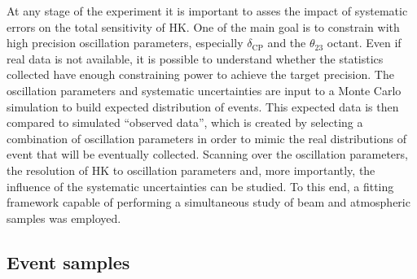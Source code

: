 At any stage of the experiment it is important to asses the impact of systematic errors on the total sensitivity of HK.
One of the main goal is to constrain with high precision oscillation parameters, especially $\delta_\text{CP}$ %
and the $\theta_{23}$ octant.
Even if real data is not available, it is possible to understand whether the statistics collected have %
enough constraining power to achieve the target precision.
The oscillation parameters and systematic uncertainties are input to a Monte Carlo simulation %
to build expected distribution of events.
This expected data is then compared to simulated ``observed data'', which is created by selecting %
a combination of oscillation parameters in order to mimic the real distributions of event that will be eventually collected.
Scanning over the oscillation parameters, the resolution of HK to oscillation parameters and, more importantly, %
the influence of the systematic uncertainties can be studied.
To this end, a fitting framework capable of performing a simultaneous study of beam and atmospheric samples was employed. 

\subsection{Event samples}
\label{sec:event_samples}

